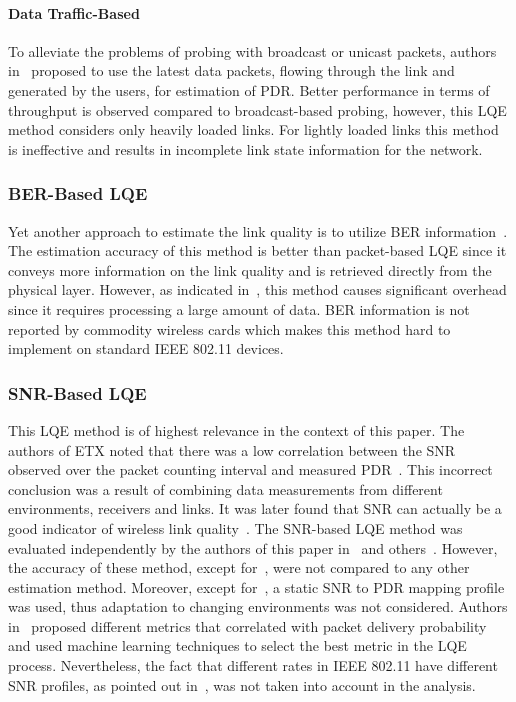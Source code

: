 \documentclass[11pt,draftclsnofoot,journal,onecolumn]{IEEEtran}
\begin{document}
\paragraph{Data Traffic-Based}

To alleviate the problems of probing with broadcast or unicast packets, authors in~\cite{zhang_2009_tmc} proposed to use the latest data packets, flowing through the link and generated by the users, for estimation of PDR. Better performance in terms of throughput is observed compared to broadcast-based probing, however, this LQE method considers only heavily loaded links. For lightly loaded links this method is ineffective and results in incomplete link state information for the network.

\subsubsection{BER-Based LQE}
\label{sec:LQE_BER}

Yet another approach to estimate the link quality is to utilize BER information~\cite{breed_2003_ber_HFE,koksal_2006_JSAC}. The estimation accuracy of this method is better than packet-based LQE since it conveys more information on the link quality and is retrieved directly from the physical layer. However, as indicated in~\cite{vlavianos_2008_PIMRC}, this method causes significant overhead since it requires processing a large amount of data. BER information is not reported by commodity wireless cards which makes this method hard to implement on standard IEEE 802.11 devices.

\subsubsection{SNR-Based LQE}
\label{sec:LQE_SNR}

This LQE method is of highest relevance in the context of this paper. The authors of ETX noted that there was a low correlation between the SNR observed over the packet counting interval and measured PDR~\cite{Couto_WN_2005}. This incorrect conclusion was a result of combining data measurements from different environments, receivers and links. It was later found that SNR can actually be a good indicator of wireless link quality~\cite{souryal_2006_wcnc,zuniga_2004_secon,srinivasan_2006_EN,lai_2003_globecom,Haratcherev_asci_2004}. The SNR-based LQE method was evaluated independently by the authors of this paper in~\cite{Zhou_VTC_2009,Zhou_Pernets_2007} and others~\cite{verma_2008_Wimesh,Zhang_Infocom_2008,Judd_Mobicom_2007,senel_2007_globecom}. However, the accuracy of these method, except for~\cite{Zhang_Infocom_2008,Judd_Mobicom_2007}, were not compared to any other estimation method. Moreover, except for~\cite{senel_2007_globecom}, a static SNR to PDR mapping profile was used, thus adaptation to changing environments was not considered. Authors in~\cite{wang_2006_realman} proposed different metrics that correlated with packet delivery probability and used machine learning techniques to select the best metric in the LQE process. Nevertheless, the fact that different rates in IEEE 802.11 have different SNR profiles, as pointed out in~\cite{Zhou_VTC_2009,Zhang_Infocom_2008}, was not taken into account in the analysis.
\end{document}
